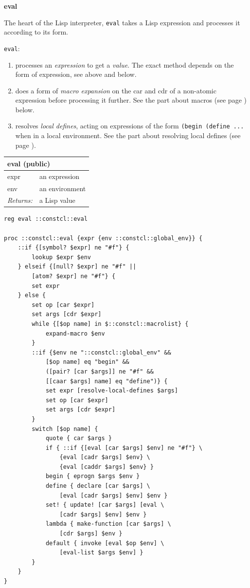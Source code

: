 \documentclass[twoside,9pt]{report}
\begin{document}
\textbf{eval}


The heart of the Lisp interpreter, \texttt{eval} takes a Lisp expression and processes it according to its form.


\texttt{eval}:

\begin{enumerate}
\item  processes an \emph{expression} to get a \emph{value}. The exact method depends on the form of expression, see above and below.
\item  does a form of \emph{macro expansion} on the car and cdr of a non-atomic expression before processing it further. See the part about macros (see page \pageref{macros}) below.
\item  resolves \emph{local defines}, acting on expressions of the form \texttt{(begin (define ...} when in a local environment. See the part about resolving local defines (see page \pageref{resolving-local-defines}).
\end{enumerate}
\begin{tabular}{ |l l| }
\hline
\multicolumn{2}{|l|}{eval (public)} \\
\hline
expr & an expression \\
env & an environment \\
\textit{Returns:} & a Lisp value \\
\hline
\end{tabular}

\noindent\makebox[\linewidth]{\rule{\linewidth}{0.4pt}}
\begin{lstlisting}
reg eval ::constcl::eval
 
proc ::constcl::eval {expr {env ::constcl::global_env}} {
    ::if {[symbol? $expr] ne "#f"} {
        lookup $expr $env
    } elseif {[null? $expr] ne "#f" ||
        [atom? $expr] ne "#f"} {
        set expr
    } else {
        set op [car $expr]
        set args [cdr $expr]
        while {[$op name] in $::constcl::macrolist} {
            expand-macro $env
        }
        ::if {$env ne "::constcl::global_env" &&
            [$op name] eq "begin" &&
            ([pair? [car $args]] ne "#f" &&
            [[caar $args] name] eq "define")} {
            set expr [resolve-local-defines $args]
            set op [car $expr]
            set args [cdr $expr]
        }
        switch [$op name] {
            quote { car $args }
            if { ::if {[eval [car $args] $env] ne "#f"} \
                {eval [cadr $args] $env} \
                {eval [caddr $args] $env} }
            begin { eprogn $args $env }
            define { declare [car $args] \
                [eval [cadr $args] $env] $env }
            set! { update! [car $args] [eval \
                [cadr $args] $env] $env }
            lambda { make-function [car $args] \
                [cdr $args] $env }
            default { invoke [eval $op $env] \
                [eval-list $args $env] }
        }
    }
}
\end{lstlisting}
\noindent\makebox[\linewidth]{\rule{\linewidth}{0.4pt}}
\end{document}
